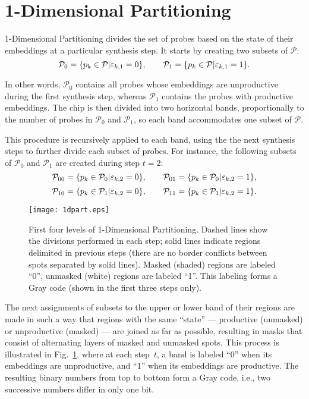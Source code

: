 \section{1-Dimensional Partitioning}
\label{sec:part_1d}

1-Dimensional Partitioning divides the set of probes based on the state of
their embeddings at a particular synthesis step. It starts by creating two
subsets of $\mathcal{P}$:
\[
\mathcal{P}_0 = \{ p_k \in \mathcal{P} | \varepsilon_{k,1} = 0 \},
\qquad
\mathcal{P}_1 = \{ p_k \in \mathcal{P} | \varepsilon_{k,1} = 1 \}.
\]

In other words, $\mathcal{P}_0$ contains all probes whose embeddings are
unproductive during the first synthesis step, whereas $\mathcal{P}_1$
contains the probes with productive embeddings. The chip is then
divided into two horizontal bands, proportionally to the number of probes in
$\mathcal{P}_0$ and $\mathcal{P}_1$, so each band accommodates one subset
of $\mathcal{P}$.

This procedure is recursively applied to each band, using the the next
synthesis steps to further divide each subset of probes. For
instance, the following subsets of $\mathcal{P}_0$ and
$\mathcal{P}_1$ are created during step $t=2$:
\[
\mathcal{P}_{00} = \{ p_k \in \mathcal{P}_0 | \varepsilon_{k,2} = 0 \},
\qquad
\mathcal{P}_{01} = \{ p_k \in \mathcal{P}_0 | \varepsilon_{k,2} = 1 \},
\]
\[
\mathcal{P}_{10} = \{ p_k \in \mathcal{P}_1 | \varepsilon_{k,2} = 0 \},
\qquad
\mathcal{P}_{11} = \{ p_k \in \mathcal{P}_1 | \varepsilon_{k,2} = 1 \}.
\]

\begin{figure}\centering
\texttt{[image: 1dpart.eps]}
\caption{\label{fig:1dpart}%
  First four levels of 1-Dimensional Partitioning. Dashed lines show the
  divisions performed in each step; solid lines indicate regions delimited in
  previous steps (there are no border conflicts between spots separated by
  solid lines). Masked (shaded) regions are labeled ``0'',
  unmasked (white) regions are labeled ``1''. This labeling forms
  a Gray code (shown in the first three steps only).}
\end{figure}


The next assignments of subsets to the upper or lower band of their regions
are made in such a way that regions with the same ``state'' --- productive
(unmasked) or unproductive (masked) --- are joined as far as
possible, resulting in masks that consist of alternating layers of masked and
unmasked spots. This process is illustrated in Fig.~\ref{fig:1dpart}, where at
each step~$t$, a band is labeled ``0'' when its embeddings are unproductive,
and ``1'' when its embeddings are productive. The resulting binary numbers
from top to bottom form a Gray code, i.e., two successive numbers differ in
only one bit.

